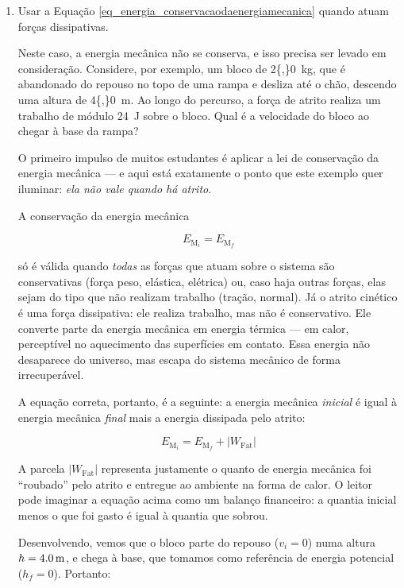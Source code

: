 \begin{enumerate}
    \item [(i)] Usar a Equação \eqref{eq_energia_conservacaodaenergiamecanica} quando atuam forças dissipativas.

    Neste caso, a energia mecânica não se conserva, e isso precisa ser levado em consideração. Considere, por exemplo, um bloco de \SI{2{,}0}{kg}, que é abandonado do repouso
no topo de uma rampa e desliza até o chão, descendo uma altura de
\SI{4{,}0}{m}. Ao longo do percurso, a força de atrito realiza um
trabalho de módulo \SI{24}{J} sobre o bloco.  Qual é a velocidade do bloco ao chegar à base da rampa?

O primeiro impulso de muitos estudantes é aplicar a lei de conservação
da energia mecânica --- e aqui está exatamente o ponto que este exemplo
quer iluminar: \emph{ela não vale quando há atrito}.

A conservação da energia mecânica

\[
  E_{\text{M}_i} = E_{\text{M}_f}
\]

\noindent só é válida quando \emph{todas} as forças que atuam sobre o
sistema são conservativas (força peso, elástica, elétrica) ou, caso haja outras forças, elas sejam do tipo que não realizam trabalho (tração, normal). Já o atrito cinético é
uma força dissipativa: ele realiza trabalho, mas não é conservativo. Ele converte parte da energia mecânica em energia
térmica --- em calor, perceptível no aquecimento das superfícies em
contato. Essa energia não desaparece do universo, mas escapa do sistema
mecânico de forma irrecuperável.

A equação correta, portanto, é a seguinte: a energia mecânica
\emph{inicial} é igual à energia mecânica \emph{final} mais a energia
dissipada pelo atrito:

\begin{equation}
  \boxed{E_{\text{M}_i} = E_{\text{M}_f} + |W_{\text{Fat}}|} \nonumber
\end{equation}

\noindent A parcela $|W_{\text{Fat}}|$ representa justamente o quanto
de energia mecânica foi ``roubado'' pelo atrito e entregue ao ambiente
na forma de calor. O leitor pode imaginar a equação acima como um
balanço financeiro: a quantia inicial menos o que foi gasto é igual à
quantia que sobrou.

Desenvolvendo, vemos que o bloco parte do repouso ($v_i = 0$) numa altura
$h = \SI{4{,}0}{m}$, e chega à base, que tomamos como referência de
energia potencial ($h_f = 0$). Portanto:


\end{enumerate}
